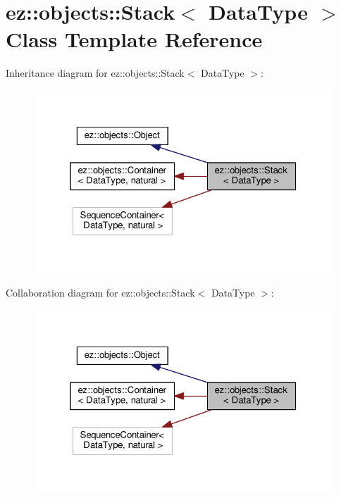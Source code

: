\hypertarget{classez_1_1objects_1_1Stack}{}\section{ez\+:\+:objects\+:\+:Stack$<$ Data\+Type $>$ Class Template Reference}
\label{classez_1_1objects_1_1Stack}


Inheritance diagram for ez\+:\+:objects\+:\+:Stack$<$ Data\+Type $>$\+:
\nopagebreak
\begin{figure}[H]
\begin{center}
\leavevmode
\includegraphics[width=325pt]{classez_1_1objects_1_1Stack__inherit__graph}
\end{center}
\end{figure}


Collaboration diagram for ez\+:\+:objects\+:\+:Stack$<$ Data\+Type $>$\+:
\nopagebreak
\begin{figure}[H]
\begin{center}
\leavevmode
\includegraphics[width=325pt]{classez_1_1objects_1_1Stack__coll__graph}
\end{center}
\end{figure}
